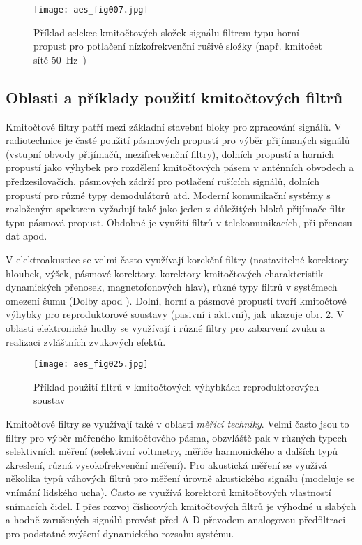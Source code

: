     \begin{figure}[ht!]
      \centering
      \texttt{[image: aes\_fig007.jpg]}
      \caption{Příklad selekce kmitočtových složek signálu filtrem typu horní propust pro potlačení
                nízkofrekvenční rušivé složky (např. kmitočet sítě \SI{50}{\Hz)}}
      \label{aes:fig007}    
    \end{figure} 
        
    \subsection{Oblasti a příklady použití kmitočtových filtrů}
      Kmitočtové filtry patří mezi základní stavební bloky pro zpracování signálů. V radiotechnice
      je časté použití pásmových propustí pro výběr přijímaných signálů (vstupní obvody přijímačů,
      mezifrekvenční filtry), dolních propustí a horních propustí jako výhybek pro rozdělení
      kmitočtových pásem v anténních obvodech a předzesilovačích, pásmových zádrží pro potlačení 
      rušících signálů, dolních propustí pro různé typy demodulátorů atd. Moderní komunikační 
      systémy s rozloženým spektrem vyžadují také jako jeden z důležitých bloků přijímače filtr 
      typu pásmová propust. Obdobné je využití filtrů v telekomunikacích, při přenosu dat apod.
  
      V elektroakustice se velmi často využívají korekční filtry (nastavitelné korektory hloubek,
      výšek, pásmové korektory, korektory kmitočtových charakteristik dynamických přenosek,
      magnetofonových hlav), různé typy filtrů v systémech omezení šumu (Dolby apod ). Dolní,
      horní a pásmové propusti tvoří kmitočtové výhybky pro reproduktorové soustavy (pasivní i
      aktivní), jak ukazuje obr. \ref{aes:fig025}. V oblasti elektronické hudby se využívají i
      různé filtry pro zabarvení zvuku a realizaci zvláštních zvukových efektů.
    
      \begin{figure}[ht!]
        \centering
        \texttt{[image: aes\_fig025.jpg]}
        \caption[Příklad použití filtrů v kmitočtových výhybkách reproduktorových
                  soustav]{Příklad použití filtrů v kmitočtových výhybkách reproduktorových
                  soustav}
        \label{aes:fig025}    
      \end{figure} 
    
      Kmitočtové filtry se využívají také v oblasti \emph{měřicí techniky}. Velmi často jsou to
      filtry pro výběr měřeného kmitočtového pásma, obzvláště pak v různých typech selektivních
      měření (selektivní voltmetry, měřiče harmonického a dalších typů zkreslení, různá
      vysokofrekvenční měření). Pro akustická měření se využívá několika typů váhových filtrů pro
      měření úrovně akustického signálu (modeluje se vnímání lidského ucha). Často se využívá
      korektorů kmitočtových vlastností snímacích čidel. I přes rozvoj číslicových kmitočtových
      filtrů je výhodné u slabých a hodně zarušených signálů provést před A-D převodem analogovou
      předfiltraci pro podstatné zvýšení dynamického rozsahu systému.

